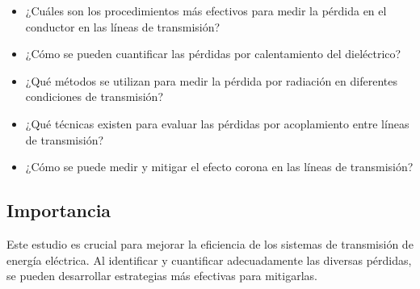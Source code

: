         \begin{itemize}
            \item ¿Cuáles son los procedimientos más efectivos para medir la pérdida en el conductor en las líneas de transmisión?
            \item ¿Cómo se pueden cuantificar las pérdidas por calentamiento del dieléctrico?    
            \item ¿Qué métodos se utilizan para medir la pérdida por radiación en diferentes condiciones de transmisión?    
            \item ¿Qué técnicas existen para evaluar las pérdidas por acoplamiento entre líneas de transmisión?    
            \item ¿Cómo se puede medir y mitigar el efecto corona en las líneas de transmisión?
        \end{itemize}

    \subsection{Importancia}

        Este estudio es crucial para mejorar la eficiencia de los sistemas de transmisión de energía eléctrica. Al identificar y cuantificar adecuadamente las diversas pérdidas, se pueden desarrollar estrategias más efectivas para mitigarlas.





\newpage